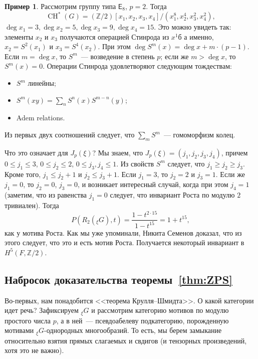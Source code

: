 \documentclass[a4paper]{article}
\DeclareMathOperator{\CH}{CH}
\theoremstyle{definition}
\newtheorem{example}[theorem]{Пример}
\begin{document}
\begin{example}
Рассмотрим группу типа $\mathsf{E}_8$, $p=2$.
Тогда
\[
\CH^*(G) = (\mathbb Z/2)[x_1,x_2,x_3,x_4]/(x_1^8,x_2^4,x_3^2,x_4^2),
\]
$\deg x_1=3, \deg x_2 = 5, \deg x_3 = 9, \deg x_4 = 15$.
Это можно увидеть так:
элементы $x_2$ и $x_3$ получаются операцией Стинрода из $x^1$б
а именно, $x_2 = S^2(x_1)$ и $x_3 = S^4(x_2)$.
При этом $\deg S^m(x) = \deg x + m\cdot(p-1)$.
Если $m=\deg x$, то $S^m$~--- возведение в степень $p$;
если же $m > \deg x$, то $S^m(x) = 0$.
Операции Стинрода удовлетворяют следующим тождествам:
\begin{itemize}
\item $S^m$ линейны;
\item $S^m(xy) = \sum_n S^n(x)S^{m-n}(y)$;
\item Adem relations.
\end{itemize}
Из первых двух соотношений следует, что $\sum_m S^m$~--- гомоморфизм
колец.

Что это означает для $J_p(\xi)$?
Мы знаем, что $J_p(\xi) = (j_1, j_2, j_3, j_4)$,
причем $0\leq j_1\leq 3$, $0\leq j_2\leq 2$, $0\leq j_3,j_4\leq 1$.
Из свойств $S^m$ следует, что $j_1\geq j_2\geq j_3$.
Кроме того, $j_1\leq j_2+1$ и $j_2\leq j_3+1$.
Если $j_1 = 3$, то $j_2=2$ и $j_3=1$.
Если же $j_1 = 0$, то $j_2=0$, $j_3=0$, и возникает
интересный случай, когда при этом $j_4=1$
(заметим, что из равенства $j_1=0$ следует,
что инвариант Роста по модулю $2$ тривиален).
Тогда
\[
P(R_2({}_{\xi}G), t) = \frac{1-t^{2\cdot 15}}{1-t^{15}} = 1 + t^{15},
\]
как у мотива Роста.
Как мы уже упоминали, Никита Семенов доказал, что из этого следует,
что это и есть мотив Роста.
Получается некоторый инвариант в $H^5(F,\mathbb{Z}/2)$.
\end{example}


\subsection{Набросок доказательства теоремы~\ref{thm:ZPS}}

Во-первых, нам понадобится <<теорема Крулля--Шмидта>>.
О какой категории идет речь?
Зафиксируем ${}_{\xi}G$ и рассмотрим категорию мотивов
по модулю простого числа $p$, а в ней~--- псевдоабелеву
подкатегорию, порожденную мотивами ${}_{\xi}G$-однородных
многообразий.
То есть, мы берем замыкание относительно взятия прямых слагаемых и
свдигов (и тензорных произведений, хотя это не важно).
\end{document}
